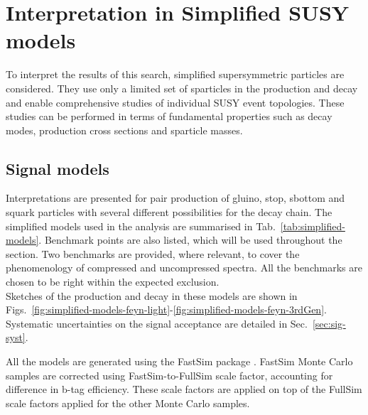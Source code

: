 \section{Interpretation in Simplified SUSY models}
\label{sec:susy}

To interpret the results of this search, simplified
supersymmetric particles are considered.  They use only a limited set
of sparticles in the production and decay and enable comprehensive
studies of individual SUSY event topologies. These studies can be
performed in terms of fundamental properties such as decay modes,
production cross sections and sparticle masses.

\subsection{Signal models}
\label{sec:susy_models}
Interpretations are presented for pair production of gluino, stop, sbottom and
squark particles with several different possibilities for the decay
chain. The simplified models used in the analysis are summarised in
Tab.~\ref{tab:simplified-models}. Benchmark points are also listed, which will
be used throughout the section. Two benchmarks are provided, where relevant,
to cover the phenomenology of compressed and uncompressed spectra. All the
benchmarks are chosen to be right within the expected exclusion. \\

Sketches of the production and decay in these models are shown in
Figs.~\ref{fig:simplified-models-feyn-light}-\ref{fig:simplified-models-feyn-3rdGen}.
Systematic uncertainties on the signal acceptance are detailed in
Sec.~\ref{sec:sig-syst}.

All the models are generated using the FastSim package
\cite{Abdullin:2011zz}.  FastSim Monte Carlo samples are corrected
using FastSim-to-FullSim scale factor, accounting for difference in
b-tag efficiency. These scale factors are applied on top of the
FullSim scale factors applied for the other Monte Carlo samples.

